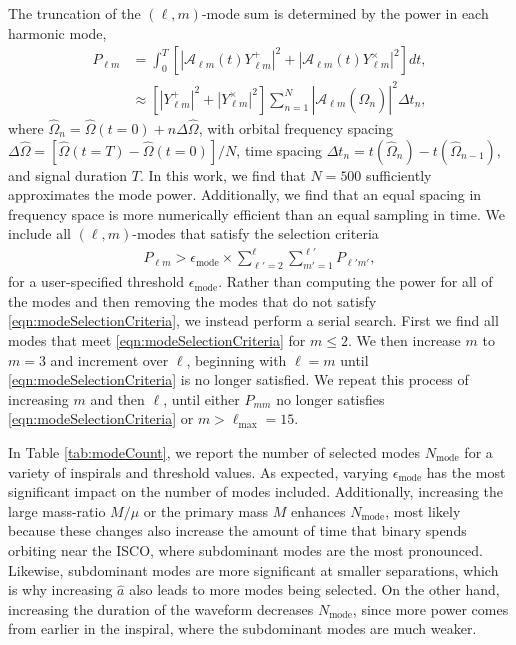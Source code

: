 \documentclass[%
 reprint,
 nofootinbib,
 amsmath,amssymb,
 aps,
 prd,
]{revtex4-2}
\begin{document}
The truncation of the $(\ell, m)$-mode sum is determined by the power in each harmonic mode,
\begin{subequations} \label{eqn:powerLM}
    \begin{align}
        P_{\ell m} &= \int_0^T \left[ \left|\mathcal{A}_{\ell m}(t) Y_{\ell m}^+\right|^2 + \left|\mathcal{A}_{\ell m}(t) Y_{\ell m}^\times\right|^2  \right]dt ,
        \\
        &\approx \left[\left|Y_{\ell m}^+\right|^2 + \left|Y_{\ell m}^\times\right|^2 \right] \sum_{n=1}^{N} |\mathcal{A}_{\ell m}(\hat{\Omega}_n)|^2 \Delta t_n,
    \end{align}
\end{subequations}
where $\hat{\Omega}_n = \hat{\Omega}(t=0) + n \Delta\hat{\Omega}$, with orbital frequency spacing $\Delta \hat{\Omega} = [\hat{\Omega}(t=T) - \hat{\Omega}(t=0)]/N$, time spacing $\Delta t_n = t(\hat{\Omega}_n) - t(\hat{\Omega}_{n-1})$, and signal duration $T$. In this work, we find that $N = 500$ sufficiently approximates the mode power. Additionally, we find that an equal spacing in frequency space is more numerically efficient than an equal sampling in time. We include all $(\ell, m)$-modes that satisfy the selection criteria
\begin{align} \label{eqn:modeSelectionCriteria}
    {P_{\ell m}} > \epsilon_\mathrm{mode} \times {\sum_{\ell' = 2}^{\ell} \sum_{m'=1}^{\ell'}P_{\ell' m'}},
\end{align}
for a user-specified threshold $\epsilon_\mathrm{mode}$. Rather than computing the power for all of the modes and then removing the modes that do not satisfy \eqref{eqn:modeSelectionCriteria}, we instead perform a serial search. First we find all modes that meet \eqref{eqn:modeSelectionCriteria} for $m \leq 2$. We then increase $m$ to $m = 3$ and increment over $\ell$, beginning with $\ell = m$ until \eqref{eqn:modeSelectionCriteria} is no longer satisfied. We repeat this process of increasing $m$ and then $\ell$, until either $P_{mm}$ no longer satisfies \eqref{eqn:modeSelectionCriteria} or $m > \ell_\mathrm{max} = 15$.

In Table \ref{tab:modeCount}, we report the number of selected modes $N_\mathrm{mode}$ for a variety of inspirals and threshold values. As expected, varying $\epsilon_\mathrm{mode}$ has the most significant impact on the number of modes included. Additionally, increasing the large mass-ratio $M/\mu$ or the primary mass $M$ enhances $N_\mathrm{mode}$, most likely because these changes also increase the amount of time that binary spends orbiting near the ISCO, where subdominant modes are the most pronounced. Likewise, subdominant modes are more significant at smaller separations, which is why increasing $\hat{a}$ also leads to more modes being selected. On the other hand, increasing the duration of the waveform decreases $N_\mathrm{mode}$, since more power comes from earlier in the inspiral, where the subdominant modes are much weaker.
\end{document}
